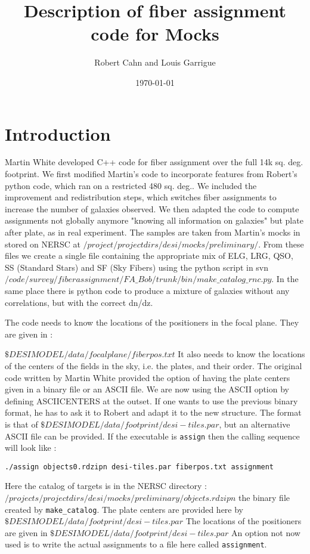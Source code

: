\documentclass{article}
\title{Description of fiber assignment code for Mocks}
\author{Robert Cahn and Louis Garrigue}
\date{\today}
\begin{document}
\maketitle

\section{Introduction}

Martin White developed C++ code for fiber assignment over the full 14k sq. deg. footprint.  We first modified Martin's code to incorporate features from Robert's python code, which ran on a restricted 480 sq. deg.. We included the improvement and redistribution steps, which switches fiber assignments to increase the number of galaxies observed. We then adapted the code to compute assignments not globally anymore "knowing all information on galaxies" but plate after plate, as in real experiment.
The samples are taken from Martin's mocks in stored on NERSC at $/project/projectdirs/desi/mocks/preliminary/$.  From these files we create a single file containing the appropriate mix of ELG, LRG, QSO, SS (Standard Stars) and SF (Sky Fibers) using the python script in svn $/code/survey/fiberassignment/FA\_Bob/trunk/bin/make\_catalog\_rnc.py$.  In the same place there is python code to produce a mixture of galaxies without any correlations, but with the correct dn/dz.  
  
  The code needs to know the locations of the positioners in the focal plane.  They are given in :
  
  $ \$DESIMODEL/data/focalplane/fiberpos.txt$
  It also needs to know the locations of the centers of the fields in the sky, i.e. the plates, and their order.  The original code written by Martin White provided the option of having the plate centers given in a binary file or an ASCII file.  We are now using the ASCII option by defining ASCIICENTERS at the outset.  If one wants to use the previous binary format, he has to ask it to Robert and adapt it to the new structure. The format is that of $\$DESIMODEL/data/footprint/desi-tiles.par$, but an alternative ASCII file can be provided.  If the executable is {\tt assign} then the calling sequence will look like :
  
  {\tt./assign objects0.rdzipn desi-tiles.par fiberpos.txt assignment}
 
 Here the catalog of targets is in the NERSC directory :
  $/projects/projectdirs/desi/mocks/preliminary/objects.rdzipn$ the binary file created by {\tt make\_catalog}.  The plate centers are provided here by  $\$DESIMODEL/data/footprint/desi-tiles.par$    The locations of the positioners are given in $ \$DESIMODEL/data/footprint/desi-tiles.par$  An option not now used is to write the actual assignments to a file here called {\tt assignment}.
  
\end{document}
